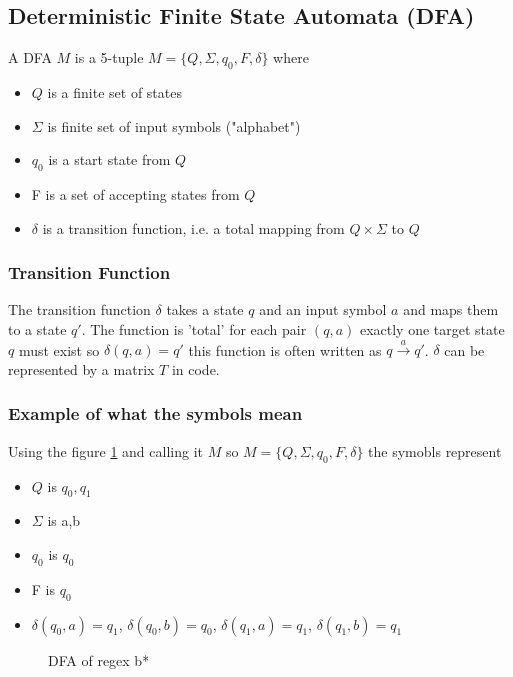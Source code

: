 \subsection{Deterministic Finite State Automata (DFA)}
A DFA $M$ is  a 5-tuple $M= \{Q,\Sigma,q_0,F,\delta\}$ where 
\begin{itemize}
    \item $Q$ is a finite set of states
    \item $\Sigma$ is finite set of input symbols ("alphabet")
    \item $q_0$ is a start state from $Q$
    \item F is a set of accepting states from $Q$
    \item $\delta$ is a transition function, i.e. a total mapping from $Q\times\Sigma$ to $Q$
\end{itemize}
\subsubsection{Transition Function}
The transition function $\delta$ takes a state $q$ and an input symbol $a$ and maps them to a state $q'$. The function is 'total' for each pair $(q,a)$ exactly one target state $q$ must exist so $\delta(q,a)=q'$ this function is often written as $q \xrightarrow{a}q'$. $\delta$ can be represented by a matrix $T$ in code.
\subsubsection{Example of what the symbols mean}
Using the figure \ref{fig:DFAB*} and calling it $M$ so $M= \{Q,\Sigma,q_0,F,\delta\}$ the symobls represent
\begin{itemize}
    \item $Q$ is $q_0,q_1$
    \item $\Sigma$ is a,b
    \item $q_0$ is $q_0$
    \item F is $q_0$
    \item $\delta(q_0,a) = q_1$, $\delta(q_0,b) = q_0$, $\delta(q_1,a) = q_1$, $\delta(q_1,b) = q_1$
\end{itemize}
\begin{figure}[H]
    \centering
    \caption{DFA of regex b*}
    \label{fig:DFAB*}
\end{figure}
